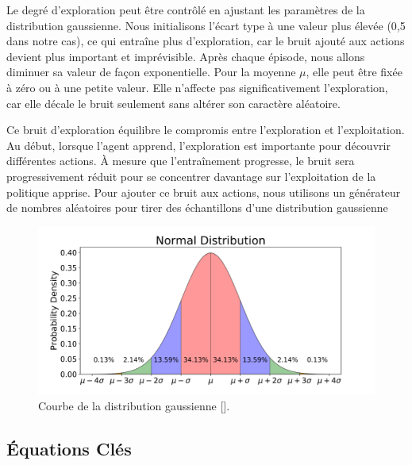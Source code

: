 Le degré d'exploration peut être contrôlé en ajustant les paramètres de la distribution gaussienne. Nous initialisons l'écart type à une valeur plus élevée (0,5 dans notre cas), ce qui entraîne plus d'exploration, car le bruit ajouté aux actions devient plus important et imprévisible. Après chaque épisode, nous allons diminuer sa valeur de façon exponentielle. Pour la moyenne $\mu$, elle peut être fixée à zéro ou à une petite valeur. Elle n'affecte pas significativement l'exploration, car elle décale le bruit seulement sans altérer son caractère aléatoire.

Ce bruit d'exploration équilibre le compromis entre l'exploration et l'exploitation. Au début, lorsque l'agent apprend, l'exploration est importante pour découvrir différentes actions. À mesure que l'entraînement progresse, le bruit sera progressivement réduit pour se concentrer davantage sur l'exploitation de la politique apprise. Pour ajouter ce bruit aux actions, nous utilisons un générateur de nombres aléatoires pour tirer des échantillons d'une distribution gaussienne

\begin{figure}[hbt!]
  \centering
  \includegraphics[width=15cm]{images_pfe/normal-distribution.png}
  \caption{Courbe de la distribution gaussienne [\cite{yoseph2019}].}
  \label{fig:normal-distribution}
\end{figure}
\FloatBarrier
\medskip

\subsection{Équations Clés}
